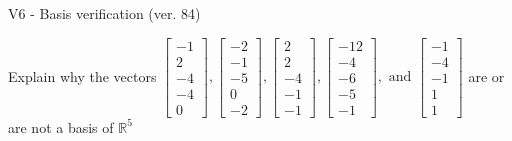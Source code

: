 \begin{exercise}
  \begin{exerciseTitle}V6 - Basis verification (ver. 84)\end{exerciseTitle}
  \begin{exerciseStatement}
    Explain why the vectors \(\left[\begin{array}{r}
-1 \\
2 \\
-4 \\
-4 \\
0
\end{array}\right] , \left[\begin{array}{r}
-2 \\
-1 \\
-5 \\
0 \\
-2
\end{array}\right] , \left[\begin{array}{r}
2 \\
2 \\
-4 \\
-1 \\
-1
\end{array}\right] , \left[\begin{array}{r}
-12 \\
-4 \\
-6 \\
-5 \\
-1
\end{array}\right] , \text{ and } \left[\begin{array}{r}
-1 \\
-4 \\
-1 \\
1 \\
1
\end{array}\right]\) are or are not a basis of \(\mathbb{R}^5\)	



\end{exerciseStatement}
\end{exercise}
